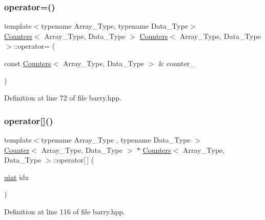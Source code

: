 \mbox{\label{classbarry_1_1_counters_a0edeb22b0b1640f7ada1ef47a30ac486}} 
\subsubsection{\texorpdfstring{operator=()}{operator=()}}
{\footnotesize\ttfamily template$<$typename Array\+\_\+\+Type, typename Data\+\_\+\+Type$>$ \\
\hyperlink{classbarry_1_1_counters}{Counters}$<$ Array\+\_\+\+Type, Data\+\_\+\+Type $>$ \hyperlink{classbarry_1_1_counters}{Counters}$<$ Array\+\_\+\+Type, Data\+\_\+\+Type $>$\+::operator= (\begin{DoxyParamCaption}\item[{const \hyperlink{classbarry_1_1_counters}{Counters}$<$ Array\+\_\+\+Type, Data\+\_\+\+Type $>$ \&}]{counter\+\_\+ }\end{DoxyParamCaption})}



Definition at line 72 of file barry.\+hpp.

\mbox{\label{classbarry_1_1_counters_a9c3ff72b5e24a299e3c1aecad0ea5eb2}} 
\subsubsection{\texorpdfstring{operator[]()}{operator[]()}}
{\footnotesize\ttfamily template$<$typename Array\+\_\+\+Type , typename Data\+\_\+\+Type $>$ \\
\hyperlink{classbarry_1_1_counter}{Counter}$<$ Array\+\_\+\+Type, Data\+\_\+\+Type $>$ $\ast$ \hyperlink{classbarry_1_1_counters}{Counters}$<$ Array\+\_\+\+Type, Data\+\_\+\+Type $>$\+::operator\mbox{[}$\,$\mbox{]} (\begin{DoxyParamCaption}\item[{\hyperlink{namespacebarry_a11dfc53ddb4672278319aa04f1e09a6c}{uint}}]{idx }\end{DoxyParamCaption})\hspace{0.3cm}{\ttfamily [inline]}}



Definition at line 116 of file barry.\+hpp.

